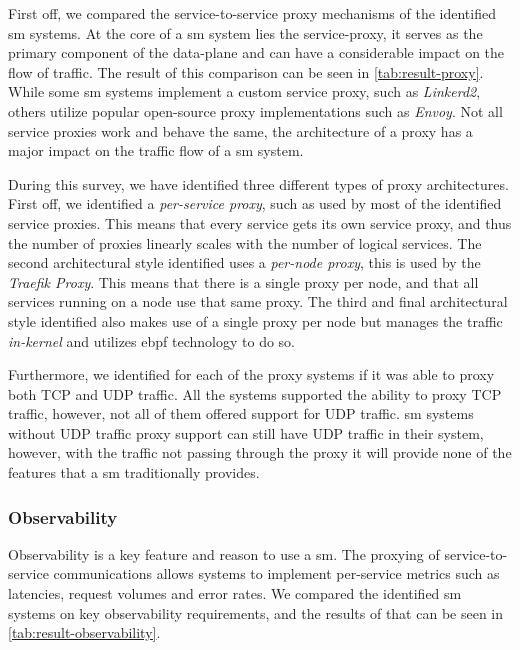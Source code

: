 First off, we compared the service-to-service proxy mechanisms of the identified \gls{sm} systems. At the core of a \gls{sm} system lies the service-proxy, it serves as the primary component of the data-plane and can have a considerable impact on the flow of traffic. The result of this comparison can be seen in \cref{tab:result-proxy}. While some \gls{sm} systems implement a custom service proxy, such as \textit{Linkerd2}, others utilize popular open-source proxy implementations such as \textit{Envoy}. Not all service proxies work and behave the same, the architecture of a proxy has a major impact on the traffic flow of a \gls{sm} system. 

During this survey, we have identified three different types of proxy architectures. First off, we identified a \textit{per-service proxy}, such as used by most of the identified service proxies. This means that every service gets its own service proxy, and thus the number of proxies linearly scales with the number of logical services. The second architectural style identified uses a \textit{per-node proxy}, this is used by the \textit{Traefik Proxy}. This means that there is a single proxy per node, and that all services running on a node use that same proxy. The third and final architectural style identified also makes use of a single proxy per node but manages the traffic \textit{in-kernel} and utilizes \gls{ebpf} technology to do so. 

Furthermore, we identified for each of the proxy systems if it was able to proxy both TCP and UDP traffic. All the systems supported the ability to proxy TCP traffic, however, not all of them offered support for UDP traffic. \Gls{sm} systems without UDP traffic proxy support can still have UDP traffic in their system, however, with the traffic not passing through the proxy it will provide none of the features that a \gls{sm} traditionally provides.


\subsubsection{Observability}
\label{sec:survey:results:comparison:observability}



Observability is a key feature and reason to use a \gls{sm}. The proxying of service-to-service communications allows systems to implement per-service metrics such as latencies, request volumes and error rates. We compared the identified \gls{sm} systems on key observability requirements, and the results of that can be seen in \cref{tab:result-observability}. 

